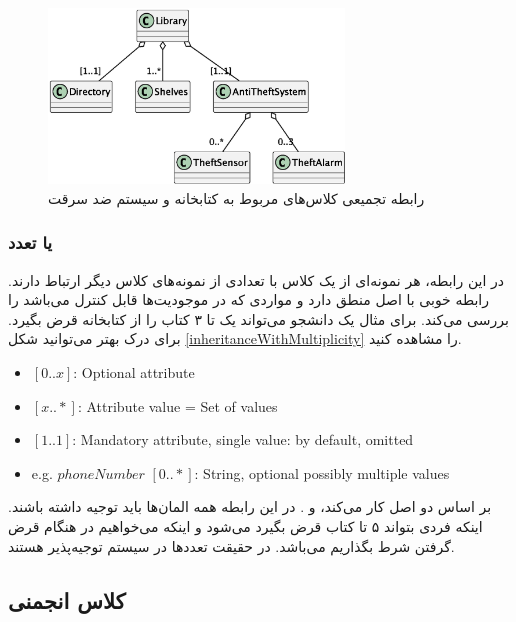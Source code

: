 \begin{figure}[H]
    \centering
    \includegraphics[width=0.7\textwidth]{assets/classes/secondAggrgation.eps}
    \caption{رابطه تجمیعی کلاس‌های مربوط به کتابخانه و سیستم ضد سرقت}
\end{figure}

\subsubsection{ یا تعدد}

در این رابطه، هر نمونه‌ای از یک کلاس با تعدادی از نمونه‌های کلاس دیگر ارتباط
دارند. رابطه خوبی با اصل منطق دارد و مواردی که در موجودیت‌ها قابل کنترل می‌باشد
را بررسی می‌کند. برای مثال یک دانشجو می‌تواند یک تا ۳ کتاب را از کتابخانه قرض
بگیرد. برای درک بهتر می‌توانید شکل \ref{inheritanceWithMultiplicity} را مشاهده
کنید.

\begin{LTR}
    \begin{itemize}
        \item $[0..x]$: Optional attribute
        \item $[x..*]$: Attribute value = Set of values
        \item $[1..1]$: Mandatory attribute, single value: by default, omitted
        \item e.g. $phoneNumber$ $[0..*]$: String, optional possibly multiple
        values
    \end{itemize}
\end{LTR}

بر اساس دو اصل کار می‌کند،  و . در این رابطه
همه المان‌ها باید توجیه داشته باشند. اینکه فردی بتواند ۵ تا کتاب قرض بگیرد
می‌شود  و اینکه می‌خواهیم در هنگام قرض گرفتن شرط بگذاریم
 می‌باشد. در حقیقت تعدد‌ها در سیستم توجیه‌پذیر هستند.

\subsection{کلاس انجمنی}

